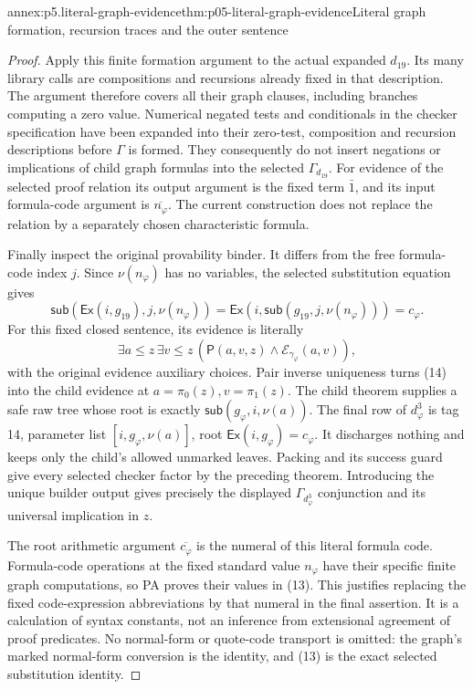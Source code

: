 \begin{annexitem}{annex:p5.literal-graph-evidence}{thm:p05-literal-graph-evidence}{Literal graph formation, recursion traces and the outer sentence}
\begin{proof}
Apply this finite formation argument to the actual expanded
\(d_{19}\). Its many library calls are compositions and recursions
already fixed in that description. The argument therefore covers
all their graph clauses, including branches computing a zero value.
Numerical negated tests and conditionals in the checker specification
have been expanded into their zero-test, composition and recursion
descriptions before \(\Gamma\) is formed. They consequently do not
insert negations or implications of child graph formulas into the
selected \(\Gamma_{d_{19}}\).
For evidence of the selected proof relation its output argument is
the fixed term \(\bar1\), and its input formula-code argument is
\(\overline{n_\varphi}\). The current construction does not
replace the relation by a separately chosen characteristic formula.

Finally inspect the original provability binder. It differs from
the free formula-code index \(j\). Since \(\nu(n_\varphi)\)
has no variables, the selected substitution equation gives
\[
 \mathsf{sub}(\mathsf{Ex}(i,g_{19}),j,\nu(n_\varphi))
       =\mathsf{Ex}(i,\mathsf{sub}(g_{19},j,\nu(n_\varphi)))
       =c_\varphi.
\tag{13}
\]
For this fixed closed sentence, its evidence is literally
\[
 \exists a\leq z\,\exists v\leq z\,
    (\mathsf P(a,v,z)\land\mathcal E_{\gamma_\varphi}(a,v)),
\tag{14}
\]
with the original evidence auxiliary choices. Pair inverse uniqueness
turns (14) into the child evidence at
\(a=\pi_0(z),v=\pi_1(z)\). The child theorem supplies a safe
raw tree whose root is exactly
\(\mathsf{sub}(g_\varphi,i,\nu(a))\). The final row of
\(d^3_\varphi\) is tag 14, parameter list
\([i,g_\varphi,\nu(a)]\), root
\(\mathsf{Ex}(i,g_\varphi)=c_\varphi\). It discharges nothing
and keeps only the child's allowed unmarked leaves. Packing and its
success guard give every selected checker factor by the preceding
theorem. Introducing the unique builder output gives precisely the
displayed \(\Gamma_{d^3_\varphi}\) conjunction and its universal
implication in \(z\).

The root arithmetic argument \(\overline{c_\varphi}\) is the
numeral of this literal formula code. Formula-code operations at
the fixed standard value \(n_\varphi\) have their specific
finite graph computations, so PA proves their values in (13).
This justifies replacing the fixed code-expression abbreviations
by that numeral in the final assertion. It is a calculation of
syntax constants, not an inference from extensional agreement of
proof predicates. No normal-form or quote-code transport is omitted:
the graph's marked normal-form conversion is the identity, and
(13) is the exact selected substitution identity.
\end{proof}
\end{annexitem}


